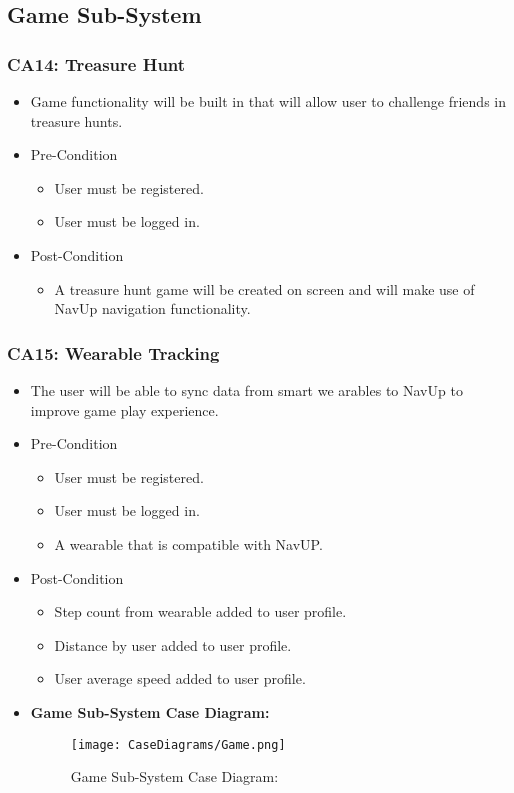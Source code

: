 \documentclass[12pt,a4paper]{article}
\begin{document}
	\subsection{Game Sub-System}
		\subsubsection{CA14: Treasure Hunt}
			\begin{itemize}
				\item Game functionality will be built in that will allow user to challenge friends in treasure hunts.
				\item Pre-Condition
					\begin{itemize}
						\item User must be registered.
						\item User must be logged in.
					\end{itemize}
				\item Post-Condition
					\begin{itemize}
						\item A treasure hunt game will be created on screen and will make use of NavUp navigation functionality.
					\end{itemize}
			\end{itemize}
		\subsubsection{CA15: Wearable Tracking}
			\begin{itemize}
				\item The user will be able to sync data from smart we arables to NavUp to improve game play experience.
				\item Pre-Condition
					\begin{itemize}
						\item User must be registered.
						\item User must be logged in.
						\item A wearable that is compatible with NavUP.
					\end{itemize}
				\item Post-Condition
					\begin{itemize}
						\item Step count from wearable added to user profile.
						\item Distance  by user added to user profile.
						\item User average speed added to user profile.
					\end{itemize}
				\item \textbf{Game Sub-System Case Diagram:}
				\begin{figure}[H]
					\texttt{[image: CaseDiagrams/Game.png]}
					\caption{Game Sub-System Case Diagram:}
				\end{figure}
			\end{itemize}
\end{document}
